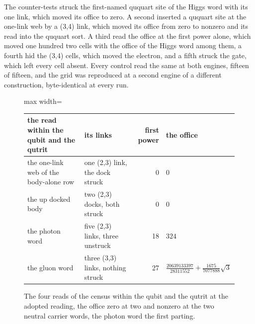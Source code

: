 \begin{chproof}
The counter-tests struck the first-named ququart site of the Higgs word with its one link, which moved its office to zero. A second inserted a ququart site at the one-link web by a (3,4) link, which moved its office from zero to nonzero and its read into the ququart sort. A third read the office at the first power alone, which moved one hundred two cells with the office of the Higgs word among them, a fourth hid the (3,4) cells, which moved the electron, and a fifth struck the gate, which left every cell absent. Every control read the same at both engines, fifteen of fifteen, and the grid was reproduced at a second engine of a different construction, byte-identical at every run.
\end{chproof}
\begin{figure}[h]\centering
\begin{adjustbox}{max width=\linewidth}\begin{tabular}{llrl}\toprule
the read within the qubit and the qutrit & its links & first power & the office \\ \midrule
the one-link web of the body-alone row & one (2,3) link, the dock struck & 0 & $0$ \\
the up docked body & two (2,3) docks, both struck & 0 & $0$ \\
the photon word & five (2,3) links, three unstruck & 18 & $324$ \\
the gluon word & three (3,3) links, nothing struck & 27 & $\tfrac{20639133397}{28311552} + \tfrac{1675}{7077888}\sqrt{3}$ \\ \bottomrule
\end{tabular}\end{adjustbox}
\caption{The four reads of the census within the qubit and the qutrit at the adopted reading, the office zero at two and nonzero at the two neutral carrier words, the photon word the first parting.}
\end{figure}
